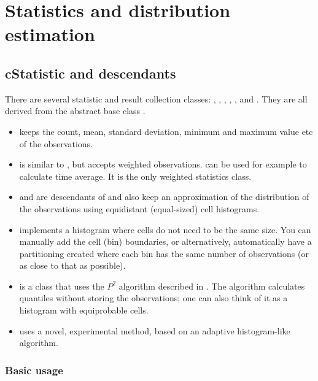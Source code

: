 \section{Statistics and distribution estimation}

\subsection{cStatistic and descendants}

There are several statistic and result collection classes:
, , ,
, ,  and
. They are all derived from the abstract base class
.

\begin{itemize}
  \item{ keeps the count, mean, standard
    deviation, minimum and maximum value etc of the observations.}
  \item{ is similar to , but
    accepts weighted observations.  can be used
    for example to calculate time average. It is the only weighted
    statistics class.}
  \item{ and  are
    descendants of  and also keep an approximation of
    the distribution of the observations using equidistant
    (equal-sized) cell histograms.}
  \item{ implements a histogram where cells do not
    need to be the same size. You can manually add the cell (bin)
    boundaries, or alternatively, automatically have a partitioning
    created where each bin has the same number of observations (or as
    close to that as possible).}
  \item{ is a class that uses the $P^{2}$ algorithm
    described in \cite{JCh85}. The algorithm calculates quantiles without
    storing the observations; one can also think of it as a histogram
    with equiprobable cells.}
  \item{ uses a novel, experimental method, based on an
    adaptive histogram-like algorithm.}
\end{itemize}

\subsubsection{Basic usage}

